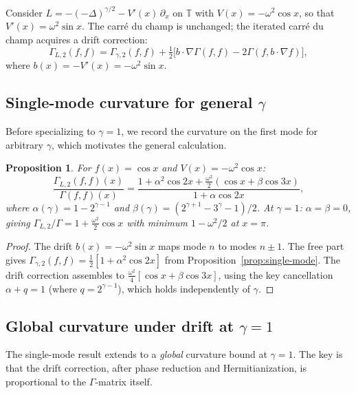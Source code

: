 \documentclass[11pt,a4paper]{article}
\theoremstyle{plain}
\newtheorem{proposition}[theorem]{Proposition}
\theoremstyle{definition}
\theoremstyle{remark}
\newcommand{\T}{\mathbb{T}}
\begin{document}
Consider $L = -(-\Delta)^{\gamma/2} - V'(x)\,\partial_x$ on $\T$
with $V(x) = -\omega^2\cos x$, so that
$V'(x) = \omega^2\sin x$. The carr\'e du champ is unchanged;
the iterated carr\'e du champ acquires a drift correction:
\begin{equation}\label{eq:G2-drift}
  \Gamma_{L,2}(f,f) = \Gamma_{\gamma,2}(f,f)
  + \tfrac{1}{2}\bigl[
    b \cdot \nabla\Gamma(f,f) - 2\Gamma(f, b \cdot \nabla f)
  \bigr],
\end{equation}
where $b(x) = -V'(x) = -\omega^2\sin x$.


\subsection{Single-mode curvature for general $\gamma$}

Before specializing to $\gamma = 1$, we record the curvature
on the first mode for arbitrary $\gamma$, which motivates the
general calculation.

\begin{proposition}\label{thm:potential-single}
For $f(x) = \cos x$ and $V(x) = -\omega^2\cos x$:
\begin{equation}\label{eq:G2-ratio-potential}
  \frac{\Gamma_{L,2}(f,f)(x)}{\Gamma(f,f)(x)}
  = \frac{1 + \alpha^2\cos 2x + \tfrac{\omega^2}{2}(\cos x + \beta\cos 3x)}
         {1 + \alpha\cos 2x},
\end{equation}
where
$\alpha(\gamma) = 1 - 2^{\gamma-1}$ and
$\beta(\gamma) = (2^{\gamma+1} - 3^\gamma - 1)/2$.
At $\gamma = 1$: $\alpha = \beta = 0$, giving
$\Gamma_{L,2}/\Gamma = 1 + \frac{\omega^2}{2}\cos x$
with minimum $1 - \omega^2/2$ at $x = \pi$.
\end{proposition}

\begin{proof}
The drift $b(x) = -\omega^2\sin x$ maps mode $n$ to modes $n \pm 1$.
The free part gives
$\Gamma_{\gamma,2}(f,f) = \frac{1}{2}[1 + \alpha^2\cos 2x]$
from Proposition~\ref{prop:single-mode}.
The drift correction assembles to
$\frac{\omega^2}{4}[\cos x + \beta\cos 3x]$,
using the key cancellation $\alpha + q = 1$ (where $q = 2^{\gamma-1}$),
which holds independently of $\gamma$.
\end{proof}


\subsection{Global curvature under drift at $\gamma = 1$}

The single-mode result extends to a \emph{global}
curvature bound at $\gamma = 1$.  The key is that the
drift correction, after phase reduction and Hermitianization,
is proportional to the $\Gamma$-matrix itself.
\end{document}
